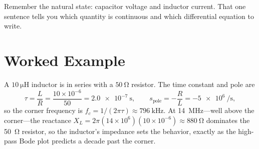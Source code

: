 \begin{exambox}
Remember the natural state: capacitor voltage and inductor current. That one
sentence tells you which quantity is continuous and which differential equation
to write.
\end{exambox}

\section{Worked Example}
A \(\SI{10}{\micro\henry}\) inductor is in series with a \(\SI{50}{\ohm}\)
resistor. The time constant and pole are
\[
\tau=\frac{L}{R}=\frac{10\times10^{-6}}{50}=\SI{2.0e-7}{\second},
\qquad
s_{\text{pole}}=-\frac{R}{L}=-\SI{5e6}{\per\second},
\]
so the corner frequency is \(f_c=1/(2\pi\tau)\approx\SI{796}{\kilo\hertz}\). At
\SI{14}{\mega\hertz}---well above the corner---the reactance
\(X_L=2\pi(14\times10^6)(10\times10^{-6})\approx\SI{880}{\ohm}\) dominates the
\SI{50}{\ohm} resistor, so the inductor's impedance sets the behavior, exactly as
the high-pass Bode plot predicts a decade past the corner.
